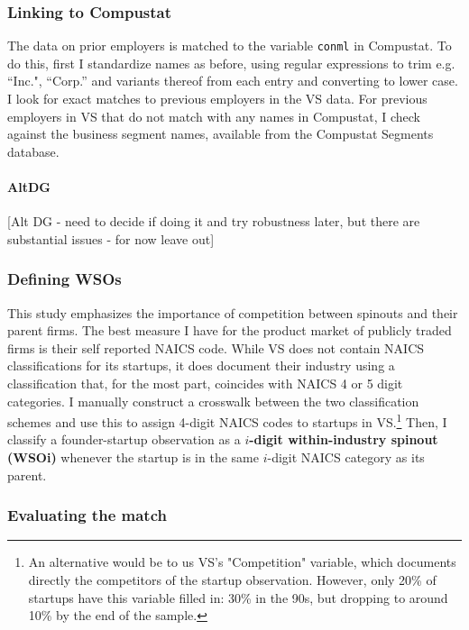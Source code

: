\documentclass[12pt,english]{article}
\theoremstyle{remark}
\begin{document}


\subsubsection{Linking to Compustat}

The data on prior employers is matched to the variable \texttt{conml} in Compustat. To do this, first I standardize names as before, using regular expressions to trim e.g. ``Inc.", ``Corp.'' and variants thereof from each entry and converting to lower case. I look for exact matches to previous employers in the VS data. For previous employers in VS that do not match with any names in Compustat, I check against the business segment names, available from the Compustat Segments database. 

\paragraph{AltDG}
[Alt DG - need to decide if doing it and try robustness later, but there are substantial issues - for now leave out]


\subsubsection{Defining WSOs}

This study emphasizes the importance of competition between spinouts and their parent firms. The best measure I have for the product market of publicly traded firms is their self reported NAICS code. While VS does not contain NAICS classifications for its startups, it does document their industry using a classification that, for the most part, coincides with NAICS 4 or 5 digit categories. I manually construct a crosswalk between the two classification schemes and use this to assign 4-digit NAICS codes to startups in VS.\footnote{An alternative would be to us VS's "Competition" variable, which documents directly the competitors of the startup observation. However, only 20\% of startups have this variable filled in: 30\% in the 90s, but dropping to around 10\% by the end of the sample.} Then, I classify a founder-startup observation as a \textbf{$i$-digit within-industry spinout (WSOi)} whenever the startup is in the same $i$-digit NAICS category as its parent. 

\subsubsection{Evaluating the match}
\end{document}
